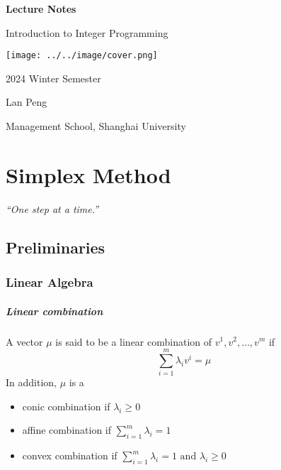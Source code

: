 
\usepackage{float}
\usepackage{subcaption}
\newcommand{\floor}[1]{\left\lfloor #1 \right\rfloor}
\newcommand{\ceil}[1]{\left\lceil #1 \right\rceil}



    \clearpage
    \newcommand\nbvspace[1][3]{\vspace*{\stretch{#1}}}
    \pagestyle{empty}
    \begin{center}
        \bfseries
        \nbvspace[4]
        \huge
        Lecture Notes

        \nbvspace[1]
        \Huge
        Introduction to Integer Programming

        \nbvspace[2]
        \texttt{[image: ../../image/cover.png]}

        \nbvspace[3]
        \large
        2024 Winter Semester

        \nbvspace[1]
        \large
        Lan Peng

        \nbvspace[1]
        \large
        Management School, Shanghai University
        \nbvspace[1]
    \end{center}

    \newpage
    \pagestyle{plain}
    \tableofcontents
    \clearpage

    \chapter{Simplex Method}
        \begin{center}
            \textit{``One step at a time.''}
        \end{center}

        \section{Preliminaries}
            \subsection{Linear Algebra}
                \paragraph{Linear combination}
                    A vector $\mu$ is said to be a linear combination of $v^1, v^2, \dots, v^m$ if
                    \begin{equation*}
                        \sum_{i=1}^m\lambda_i v^i=\mu
                    \end{equation*}
                    In addition, $\mu$ is a 
                    \begin{itemize}
                        \item conic combination if $\lambda_i \ge 0$
                        \item affine combination if $\sum_{i=1}^m \lambda_i =1$
                        \item convex combination if $\sum_{i=1}^m \lambda_i =1 \text{ and } \lambda_i \ge 0$
                    \end{itemize}

